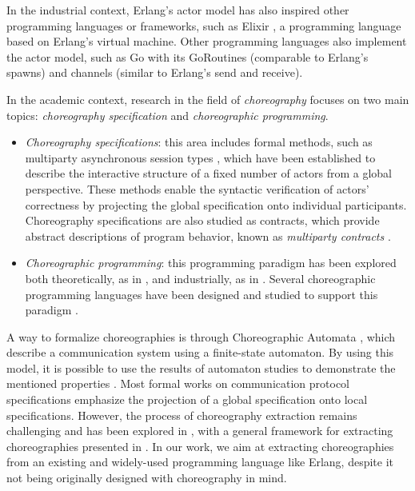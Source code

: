 \label{sota}
In the industrial context, Erlang's actor model has also inspired other 
programming languages or frameworks, such as Elixir \cite{website:elixir}, a 
programming language based on Erlang's virtual machine. Other programming 
languages also implement the actor model, such as Go \cite{website:golang} with 
its GoRoutines (comparable to Erlang's spawns) and channels (similar to Erlang's
send and receive).

\bigskip

In the academic context, research in the field of \textit{choreography} focuses 
on two main topics: \textit{choreography specification} and 
\textit{choreographic programming}.
\begin{itemize}
    \item \textit{Choreography specifications}: this area includes formal 
    methods, such as multiparty asynchronous session types 
    \cite{honda2008multiparty}, which have been established to describe the 
    interactive structure of a fixed number of actors from a global perspective.
    These methods enable the syntactic verification of actors' correctness by 
    projecting the global specification onto individual participants. 
    Choreography specifications are also studied as contracts, which provide 
    abstract descriptions of program behavior, known as \textit{multiparty 
    contracts} \cite{zava}.
    \item \textit{Choreographic programming}: this programming paradigm has been
    explored both theoretically, as in \cite{website:wscdl}, and industrially, 
    as in \cite{website:bpmn}. Several choreographic programming languages have
    been designed and studied to support this paradigm \cite{montesi2010jolie, 
    montesi2014choreographic, giallorenzo2020object, dalla2014aiocj}.
\end{itemize}

A way to formalize choreographies is through Choreographic Automata 
\cite{barbanerachoreography}, which describe a communication system using a 
finite-state automaton. By using this model, it is possible to use the results 
of automaton studies to demonstrate the mentioned properties 
\cite{orlando2021corinne}. Most formal works on communication protocol 
specifications emphasize the projection of a global specification onto local 
specifications. However, the process of choreography extraction remains 
challenging and has been explored in \cite{cruz2017paths}, with a general 
framework for extracting choreographies presented in 
\cite{cruz2022implementing}. In our work, we aim at extracting choreographies 
from an existing and widely-used programming language like Erlang, despite it 
not being originally designed with choreography in mind.